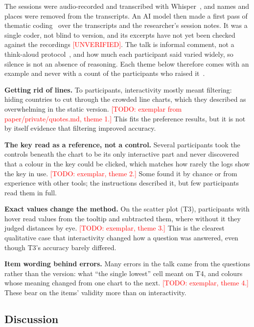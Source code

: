 \documentclass[10pt,twocolumn]{article}
\newcommand{\todo}[1]{\textcolor{red}{[TODO: #1]}}
\newcommand{\unverified}{\textcolor{red}{[UNVERIFIED]}}
\begin{document}
The sessions were audio-recorded and transcribed with Whisper~\cite{radford2023}, and names and places were removed from the transcripts. An AI model then made a first pass of thematic coding~\cite{braun2006} over the transcripts and the researcher's session notes. It was a single coder, not blind to version, and its excerpts have not yet been checked against the recordings \unverified. The talk is informal comment, not a think-aloud protocol~\cite{ericsson1993}, and how much each participant said varied widely, so silence is not an absence of reasoning. Each theme below therefore comes with an example and never with a count of the participants who raised it~\cite{mcdonald2019}.

\textbf{Getting rid of lines.} To participants, interactivity mostly meant filtering: hiding countries to cut through the crowded line charts, which they described as overwhelming in the static version. \todo{exemplar from paper/private/quotes.md, theme 1.} This fits the preference results, but it is not by itself evidence that filtering improved accuracy.

\textbf{The key read as a reference, not a control.} Several participants took the controls beneath the chart to be its only interactive part and never discovered that a colour in the key could be clicked, which matches how rarely the logs show the key in use. \todo{exemplar, theme 2.} Some found it by chance or from experience with other tools; the instructions described it, but few participants read them in full.

\textbf{Exact values change the method.} On the scatter plot (T3), participants with hover read values from the tooltip and subtracted them, where without it they judged distances by eye. \todo{exemplar, theme 3.} This is the clearest qualitative case that interactivity changed how a question was answered, even though T3's accuracy barely differed.

\textbf{Item wording behind errors.} Many errors in the talk came from the questions rather than the version: what ``the single lowest'' cell meant on T4, and colours whose meaning changed from one chart to the next. \todo{exemplar, theme 4.} These bear on the items' validity more than on interactivity.

\subsection{Discussion}
\label{sec:discussion}
\end{document}
